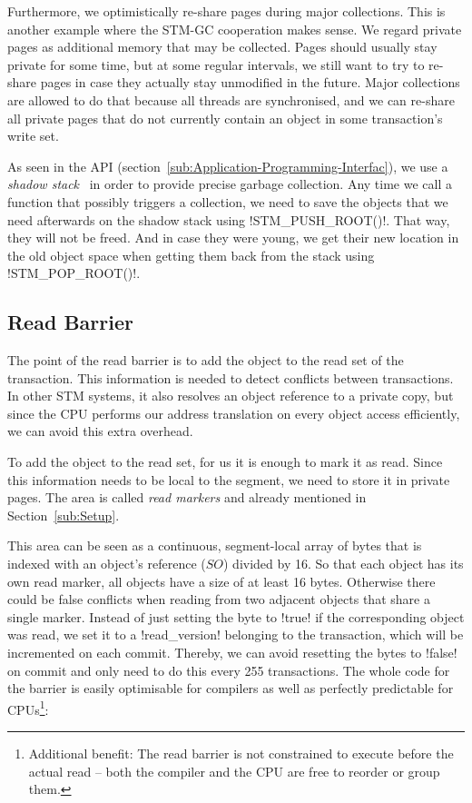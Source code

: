 \documentclass{sigplanconf}
\makeatletter
\renewcommand\lstinline[1][]{%
  \Collectverb{\@@myverb}%
}
\def\@@myverb#1{%
    \begingroup
    \fboxsep=0.2em
    \colorbox{verylightgray}{\oldlstinline|#1|}%
    \endgroup
}
\makeatother
\begin{document}
Furthermore, we optimistically re-share pages during major collections.
This is another example where the STM-GC cooperation makes sense. We
regard private pages as additional memory that may be collected.
Pages should usually stay private for some time, but at some regular
intervals, we still want to try to re-share pages in case they actually
stay unmodified in the future. Major collections are allowed to do
that because all threads are synchronised, and we can re-share all
private pages that do not currently contain an object in some
transaction's  write set.

As seen in the API (section~\ref{sub:Application-Programming-Interfac}),
we use a \emph{shadow stack}~\cite{fergus02} in order to provide precise garbage
collection.  Any time we call a function that possibly triggers a
collection, we need to save the objects that we need afterwards on the
shadow stack using \lstinline!STM_PUSH_ROOT()!.  That way, they will
not be freed. And in case they were young, we get their new location
in the old object space when getting them back from the stack using
\lstinline!STM_POP_ROOT()!.




\subsection{Read Barrier}

The point of the read barrier is to add the object to the read set of
the transaction. This information is needed to detect conflicts
between transactions. In other STM systems, it also resolves an object reference to
a private copy, but since the CPU performs our address translation on
every object access efficiently, we can avoid this extra overhead.

To add the object to the read set, for us it is enough to mark it as
read. Since this information needs to be local to the segment, we need
to store it in private pages. The area is called \emph{read markers}
and already mentioned in Section~\ref{sub:Setup}.

This area can be seen as a continuous, segment-local array of bytes
that is indexed with an object's reference ($SO$) divided by 16. So
that each object has its own read marker, all objects have a size of
at least 16 bytes. Otherwise there could be false conflicts when
reading from two adjacent objects that share a single marker.
Instead of just setting the byte to \lstinline!true!  if the
corresponding object was read, we set it to a \lstinline!read_version!
belonging to the transaction, which will be incremented on each
commit.  Thereby, we can avoid resetting the bytes to
\lstinline!false!  on commit and only need to do this every 255
transactions. The whole code for the barrier is easily optimisable for
compilers as well as perfectly predictable for
CPUs\footnote{Additional benefit: The read barrier is not constrained
to execute before the actual read -- both the compiler and the CPU are
free to reorder or group them.}:
\end{document}
